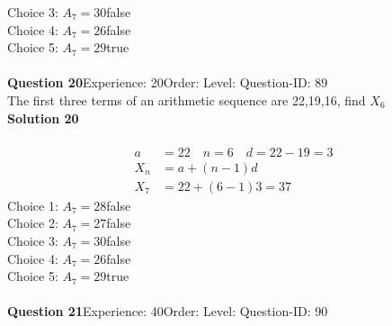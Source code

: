 \documentclass{article}
\begin{document}
Choice 3: \hspace{20pt}$A_7=30$\hspace{20pt}false\\
Choice 4: \hspace{20pt}$A_7=26$\hspace{20pt}false\\
Choice 5: \hspace{20pt}$A_7=29$\hspace{20pt}true\\
\\[4pt]
\noindent\textbf{Question 20}\hspace{20pt}Experience: 20\hspace{20pt}Order: \hspace{20pt}Level: \hspace{20pt}Question-ID: 89\\[2pt]
The first three terms of an arithmetic sequence are 22,19,16, find $X_6$\\[4pt]
\noindent\textbf{Solution 20}\\[2pt]
\\[-35pt]\begin{align*}
a&=22 \quad n=6 \quad d=22-19=3\\[2pt]
X_n&=a+(n-1)d\\[2pt]
X_7&=22+(6-1)3=37
\end{align*}
Choice 1: \hspace{20pt}$A_7=28$\hspace{20pt}false\\
Choice 2: \hspace{20pt}$A_7=27$\hspace{20pt}false\\
Choice 3: \hspace{20pt}$A_7=30$\hspace{20pt}false\\
Choice 4: \hspace{20pt}$A_7=26$\hspace{20pt}false\\
Choice 5: \hspace{20pt}$A_7=29$\hspace{20pt}true\\
\\[4pt]
\noindent\textbf{Question 21}\hspace{20pt}Experience: 40\hspace{20pt}Order: \hspace{20pt}Level: \hspace{20pt}Question-ID: 90\\[2pt]
\end{document}

